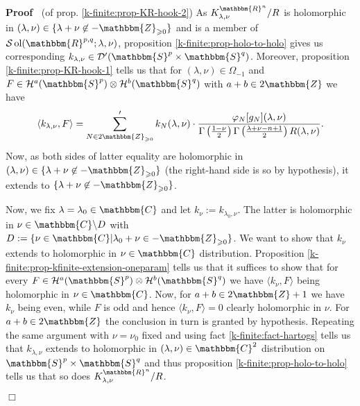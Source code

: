 \documentclass{article}
\newcommand{\assign}{:=}
\newcommand{\nin}{\not\in}
\newcommand{\tmop}[1]{\ensuremath{\operatorname{#1}}}
\newenvironment{proof}{\noindent\textbf{Proof\ }}{\hspace*{\fill}$\Box$\medskip}
\numberwithin{definition}{section}
\numberwithin{lemma}{section}
\numberwithin{proposition}{section}
{\theorembodyfont{\rmfamily}\newtheorem{remark}{Remark}
\numberwithin{remark}{section}
}
\begin{document}
\begin{proof}
  (of prop. \ref{k-finite:prop-KR-hook-2}) As $K_{\lambda,
  \nu}^{\mathbbm{R}^n} / R$ is holomorphic in $( \lambda, \nu) \in \{ \lambda
  + \nu \nin -\mathbbm{Z}_{\geqslant 0} \}$ and is a member of $\mathcal{S}
  \tmop{ol} ( \mathbbm{R}^{p, q} ; \lambda, \nu)$, proposition
  \ref{k-finite:prop-holo-to-holo} gives us corresponding $k_{\lambda, \nu}
  \in \mathcal{D}' ( \mathbbm{S}^p \times \mathbbm{S}^q)$. Moreover,
  proposition \ref{k-finite:prop-KR-hook-1} tells us that for $( \lambda, \nu)
  \in \Omega_{- 1}$ and $F \in \mathcal{H}^a ( \mathbbm{S}^p) \otimes
  \mathcal{H}^b ( \mathbbm{S}^q)$ with $a + b \in 2\mathbbm{Z}$ we have
  \[ \langle k_{\lambda, \nu}, F \rangle = \sum'_{N \in
     2\mathbbm{Z}_{\geqslant 0}} k_N ( \lambda, \nu) \cdot \frac{\varphi_N
     [ g_N] ( \lambda, \nu)}{\Gamma \left( \frac{1 - \nu}{2} \right) \Gamma
     \left( \frac{\lambda + \nu - n + 1}{2} \right) R ( \lambda, \nu)} . \]
  Now, as both sides of latter equality are holomorphic in $( \lambda, \nu)
  \in \{ \lambda + \nu \nin -\mathbbm{Z}_{\geqslant 0} \}$ (the right-hand
  side is so by hypothesis), it extends to $\{ \lambda + \nu \nin
  -\mathbbm{Z}_{\geqslant 0} \}$.
  
  Now, we fix $\lambda = \lambda_0 \in \mathbbm{C}$ and let $k_{\nu} \assign
  k_{\lambda_0, \nu}$. The latter is holomorphic in $\nu \in
  \mathbbm{C}\backslash D_{}$ with $D_{} \assign \{ \nu \in \mathbbm{C} |
  \lambda_0 + \nu \in -\mathbbm{Z}_{\geqslant 0} \}$. We want to show that
  $k_{\nu}$ extends to holomorphic in $\nu \in \mathbbm{C}$ distribution.
  Proposition \ref{k-finite:prop-kfinite-extension-oneparam} tells us that it
  suffices to show that for every $F \in \mathcal{H}^a ( \mathbbm{S}^p)
  \otimes \mathcal{H}^b ( \mathbbm{S}^q)$ we have $\langle k_{\nu}, F \rangle$
  being holomorphic in $\nu \in \mathbbm{C}$. Now, for $a + b \in
  2\mathbbm{Z}+ 1$ we have $k_{\nu}$ being even, while $F$ is odd and hence
  $\langle k_{\nu}, F \rangle = 0$ clearly holomorphic in $\nu$. For $a + b
  \in 2\mathbbm{Z}$ the conclusion in turn is granted by hypothesis. Repeating
  the same argument with $\nu = \nu_0$ fixed and using fact
  \ref{k-finite:fact-hartogs} tells us that $k_{\lambda, \nu}$ extends to
  holomorphic in $( \lambda, \nu) \in \mathbbm{C}^2$ distribution on
  $\mathbbm{S}^p \times \mathbbm{S}^q$ and thus proposition
  \ref{k-finite:prop-holo-to-holo} tells us that so does $K_{\lambda,
  \nu}^{\mathbbm{R}^n} / R$.
  

\end{proof}
\end{document}

